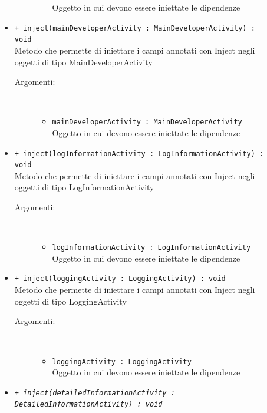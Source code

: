 \documentclass[../DefinizioneDiProdotto.tex]{subfiles}
\begin{document}
\begin{description}
\begin{itemize}
\begin{description}
\begin{itemize}
				Oggetto in cui devono essere iniettate le dipendenze\end{itemize}
		\end{description}
		\item \texttt{+ inject(mainDeveloperActivity : MainDeveloperActivity) : void}\\
		Metodo che permette di iniettare i campi annotati con Inject negli oggetti di tipo MainDeveloperActivity
		\begin{description}
			\item[Argomenti:] \
			\begin{itemize}
				\item \texttt{mainDeveloperActivity : MainDeveloperActivity}\\
				Oggetto in cui devono essere iniettate le dipendenze\end{itemize}
		\end{description}
		\item \texttt{+ inject(logInformationActivity : LogInformationActivity) : void}\\
		Metodo che permette di iniettare i campi annotati con Inject negli oggetti di tipo LogInformationActivity
		\begin{description}
			\item[Argomenti:] \
			\begin{itemize}
				\item \texttt{logInformationActivity : LogInformationActivity}\\
				Oggetto in cui devono essere iniettate le dipendenze\end{itemize}
		\end{description}
		\item \texttt{+ inject(loggingActivity : LoggingActivity) : void}\\
		Metodo che permette di iniettare i campi annotati con Inject negli oggetti di tipo LoggingActivity
		\begin{description}
			\item[Argomenti:] \
			\begin{itemize}
				\item \texttt{loggingActivity : LoggingActivity}\\
				Oggetto in cui devono essere iniettate le dipendenze\end{itemize}
		\end{description}
		\item \texttt{+ \textit{inject(detailedInformationActivity : DetailedInformationActivity) : void}}\\

\end{itemize}
\end{description}
\end{document}
